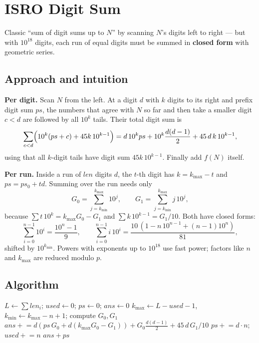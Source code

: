 \section{ISRO Digit Sum}
\label{sec:n-isro}


\begin{patternbox}
Classic ``sum of digit sums up to $N$'' by scanning $N$'s digits left to right
--- but with $10^{18}$ digits, each run of equal digits must be summed in
\textbf{closed form} with geometric series.
\end{patternbox}

\subsection*{Approach and intuition}

\textbf{Per digit.} Scan $N$ from the left. At a digit $d$ with $k$ digits to
its right and prefix digit sum $ps$, the numbers that agree with $N$ so far
and then take a smaller digit $c<d$ are followed by all $10^k$ tails. Their
total digit sum is
\[
  \sum_{c<d}\Bigl(10^k(ps+c)+45k\,10^{k-1}\Bigr)
  = d\,10^k ps+10^k\frac{d(d-1)}2+45\,d\,k\,10^{k-1},
\]
using that all $k$-digit tails have digit sum $45k\,10^{k-1}$. Finally add
$f(N)$ itself.

\textbf{Per run.} Inside a run of $len$ digits $d$, the $t$-th digit has
$k=k_{\max}-t$ and $ps=ps_0+td$. Summing over the run needs only
\[
  G_0=\sum_{j=k_{\min}}^{k_{\max}}10^j,\qquad G_1=\sum_{j=k_{\min}}^{k_{\max}}j\,10^j,
\]
because $\sum t\,10^k=k_{\max}G_0-G_1$ and $\sum k\,10^{k-1}=G_1/10$. Both have
closed forms:
\[
  \sum_{i=0}^{n-1}10^i=\frac{10^n-1}{9},\qquad
  \sum_{i=0}^{n-1}i\,10^i=\frac{10\,(1-n\,10^{n-1}+(n-1)10^n)}{81},
\]
shifted by $10^{k_{\min}}$. Powers with exponents up to $10^{18}$ use fast
power; factors like $n$ and $k_{\max}$ are reduced modulo $p$.

\subsection*{Algorithm}
\begin{algorithmic}[1]
\State $L\gets\sum len_i$; $used\gets0$; $ps\gets0$; $ans\gets0$
  \State $k_{\max}\gets L-used-1$, $k_{\min}\gets k_{\max}-n+1$; compute $G_0,G_1$
  \State $ans\mathrel{+}=d(ps\,G_0+d(k_{\max}G_0-G_1))+G_0\frac{d(d-1)}2+45\,d\,G_1/10$
  \State $ps\mathrel{+}=d\cdot n$; $used\mathrel{+}=n$
\EndFor
\State \Return $ans+ps$
\end{algorithmic}

